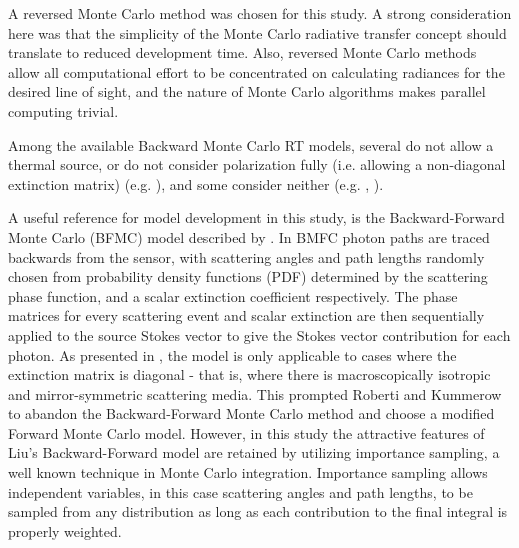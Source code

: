 A reversed Monte Carlo method was chosen for this study.  A strong
consideration here was that the simplicity of the Monte
Carlo radiative transfer concept should translate to reduced
development time.  Also, reversed Monte Carlo methods allow
all computational effort to be concentrated on calculating radiances
for the desired line of sight, and the nature of Monte Carlo
algorithms makes parallel computing trivial.     

Among the available Backward Monte Carlo RT models, several do not
allow a thermal source, or do not consider polarization fully (i.e.
allowing a non-diagonal extinction matrix) (e.g. \cite{liuetal:96}), and
some consider neither (e.g. \cite{oikarenenetal:99}, \cite{ishimoto:02}).

A useful reference for model development in this study, is the
Backward-Forward Monte Carlo (BFMC) model described by \cite{liuetal:96}.  
In BMFC photon paths are traced backwards
from the sensor, with scattering angles and path lengths randomly
chosen from probability density functions (PDF) determined by the scattering
phase function, and a scalar extinction coefficient respectively.  The
phase matrices for every scattering event and scalar extinction are
then sequentially applied to the source Stokes vector to give the Stokes
vector contribution for each photon.  As presented in \cite{liuetal:96}, the model is only
applicable to cases where the extinction matrix is diagonal - that is,
 where there is macroscopically isotropic and mirror-symmetric
 scattering media.  This prompted Roberti and Kummerow
 \cite{roberti:99} to abandon the Backward-Forward Monte Carlo method and
 choose a modified Forward Monte Carlo model. However, in this study the
 attractive features of Liu's Backward-Forward model are retained by
 utilizing importance sampling, a well known technique in Monte Carlo
 integration. Importance sampling allows independent variables, in
 this case scattering angles and path lengths, to be sampled from any
 distribution as long as each contribution to the final integral is
 properly weighted.


